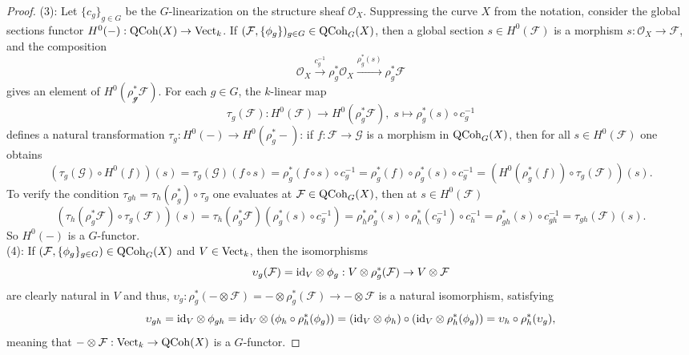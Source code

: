 \documentclass[10pt]{amsart}
\theoremstyle{definition}
\begin{document}
\begin{proof}
(3): Let $\{c_g\}_{g\in G}$ be the $G$-linearization on the structure sheaf $\mathcal{O}_X$. Suppressing the curve $X$ from the notation, consider the global sections functor $H^0(-):{\rm QCoh}(X)\rightarrow {\rm Vect}_k$. If $(\mathcal{F},\{\phi_g\})_{g\in G}\in {\rm QCoh}_G(X)$, then a global section $s\in H^0(\mathcal{F})$ is a morphism $s:\mathcal{O}_X\rightarrow \mathcal{F}$, and the composition
\[
\mathcal{O}_X\overset{c_g^{-1}}{\rightarrow}\rho_g^*\mathcal{O}_X\overset{\rho_g^*(s)}{\rightarrow}\rho_g^*\mathcal{F}
\]
gives an element of $H^0(\mathcal{\rho_g^*F})$. For each $g\in G$, the $k$-linear map
\[
\tau_g(\mathcal{F}):H^0(\mathcal{F})\rightarrow H^0(\rho_g^*\mathcal{F}),\;s\mapsto\rho_g^*(s)\circ c_g^{-1}
\]
defines a natural transformation $\tau_g:H^0(-)\rightarrow H^0(\rho_g^*-)$: if $f:\mathcal{F}\rightarrow \mathcal{G}$ is a morphism in ${\rm QCoh}_G(X)$, then for all $s\in H^0(\mathcal{F})$ one obtains 
\[
(\tau_g(\mathcal{G})\circ H^0(f))(s)
=\tau_g(\mathcal{G})(f\circ s)
=\rho_g^*(f\circ s)\circ c_g^{-1}
=\rho_g^*(f)\circ \rho_g^*(s)\circ c_g^{-1}
=(H^0(\rho_g^*(f))\circ\tau_g(\mathcal{F}))(s).
\]
To verify the condition $\tau_{gh}=\tau_h(\rho_g^*)\circ\tau_g$ one evaluates at $\mathcal{F}\in {\rm QCoh}_G(X)$, then at $s\in H^0(\mathcal{F})$
\[
(\tau_h(\rho^*_g\mathcal{F})\circ \tau_g(\mathcal{F}))(s)
=\tau_h(\rho^*_g\mathcal{F})(\rho_g^*(s)\circ c_g^{-1})
=\rho_h^*\rho_g^*(s)\circ \rho_h^*(c_g^{-1})\circ c_h^{-1}
=\rho_{gh}^*(s)\circ c_{gh}^{-1}
=\tau_{gh}(\mathcal{F})(s).
\]
So $H^0(-)$ is a $G$-functor.\\



(4): If $(\mathcal{F},\{\phi_g\}_{g\in G})\in {\rm QCoh}_G(X)$ and $V \in {\rm Vect}_k$, then the isomorphisms
\[
\upsilon_{g}(\mathcal{F})
={\rm id}_V\otimes \phi_g:V\otimes\rho_g^*(\mathcal{F})\rightarrow V\otimes \mathcal{F}
\]
are clearly natural in $V$ and thus, $\upsilon_g:\rho_g^*(-\otimes\mathcal{F})=-\otimes\rho_g^*(\mathcal{F})\rightarrow -\otimes\mathcal{F}$ is a natural isomorphism, satisfying
\[
\upsilon_{gh}=
{\rm id}_V\otimes\phi_{gh}={\rm id}_V\otimes (\phi_h\circ \rho_h^*(\phi_g))=({\rm id}_V\otimes\phi_h)\circ ({\rm id}_V\otimes\rho_h^*(\phi_g))=\upsilon_h\circ\rho_h^*(\upsilon_g),
\]
meaning that $-\otimes\mathcal{F}:{\rm Vect}_k\rightarrow{\rm QCoh}(X)$ is a $G$-functor.
\end{proof}
\end{document}
